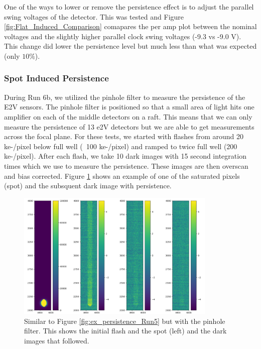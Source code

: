 \documentclass[DM,authoryear,toc]{lsstdoc}
\begin{document}
One of the ways to lower or remove the persistence effect is to adjust the parallel swing voltages of the detector.
This was tested and Figure \ref{fig:Flat_Induced_Comparison} comapares the per amp plot between the nominal voltages and the slightly higher parallel clock swing voltages (-9.3 vs -9.0 V).
This change did lower the persistence level but much less than what was expected (only $10\%$).


\subsubsection{Spot Induced Persistence}
During Run 6b, we utilized the pinhole filter to measure the persistence of the E2V sensors.
The pinhole filter is positioned so that a small area of light hits one amplifier on each of the middle detectors on a raft.
This means that we can only measure the persistence of 13 e2V detectors but we are able to get measurements across the focal plane.
For these tests, we started with flashes from around 20 ke-/pixel below full well (~100 ke-/pixel) and ramped to twice full well (200 ke-/pixel).
After each flash, we take 10 dark images with 15 second integration times which we use to measure the persistence.
These images are then overscan and bias corrected.
Figure \ref{fig:Run6_example} shows an example of one of the saturated pixels (spot) and the subsquent dark image with persistence.

\begin{figure}[!htp]
  \centering
  \includegraphics[width=0.85\textwidth, angle=0]{Run6_ex.png}
  \caption{
  Similar to Figure \ref{fig:ex_persistence_Run5} but with the pinhole filter. 
  This shows the initial flash and the spot (left) and the dark images that followed.
  }\label{fig:Run6_example}
\end{figure}
\end{document}
